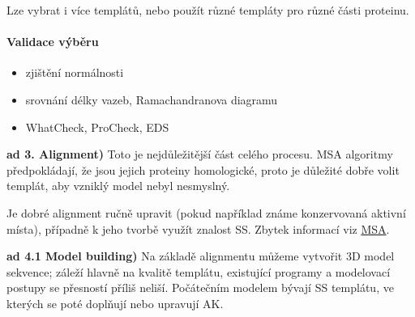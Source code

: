 \documentclass[DIV=8]{scrreprt}
\begin{document}
Lze vybrat i více templátů, nebo použít různé templáty pro různé části proteinu.

\paragraph{Validace výběru}
\begin{itemize}[nosep]
    \item zjištění normálnosti
    \item srovnání délky vazeb, Ramachandranova diagramu
    \item WhatCheck, ProCheck, EDS
\end{itemize}



\textbf{ad 3. Alignment)} Toto je nejdůležitější část celého procesu. MSA algoritmy předpokládají, že jsou jejich proteiny homologické, proto je důležité dobře volit templát, aby vzniklý model nebyl nesmyslný.

Je dobré alignment ručně upravit (pokud například známe konzervovaná aktivní místa), případně k jeho tvorbě využít znalost SS. Zbytek informací viz \hyperref[Multiple sequence alignment]{MSA}.

\textbf{ad 4.1 Model building)} Na základě alignmentu můžeme vytvořit 3D model sekvence; záleží hlavně na kvalitě templátu, existující programy a modelovací postupy se přesností příliš neliší. Počátečním modelem bývají SS templátu, ve kterých se poté doplňují nebo upravují AK.
\end{document}
